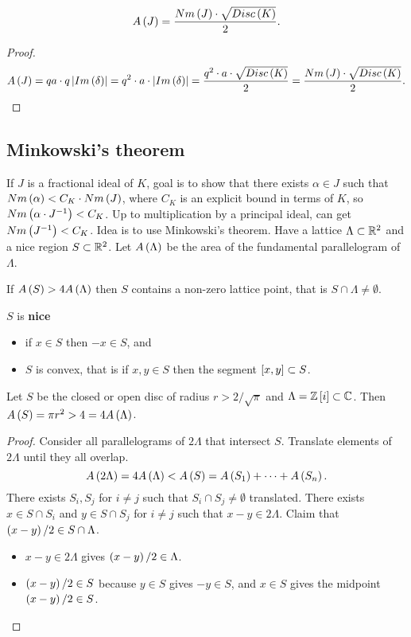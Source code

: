 \begin{proposition}
$$ A\rb{J} = \dfrac{Nm\rb{J} \cdot \sqrt{Disc\rb{K}}}{2}. $$
\end{proposition}

\begin{proof}
$$ A\rb{J} = qa \cdot q\abs{Im\rb{\delta}} = q^2 \cdot a \cdot \abs{Im\rb{\delta}} = \dfrac{q^2 \cdot a \cdot \sqrt{Disc\rb{K}}}{2} = \dfrac{Nm\rb{J} \cdot \sqrt{Disc\rb{K}}}{2}. $$
\end{proof}

\subsection{Minkowski's theorem}

If $ J $ is a fractional ideal of $ K $, goal is to show that there exists $ \alpha \in J $ such that $ Nm\rb{\alpha} < C_K \cdot Nm\rb{J} $, where $ C_K $ is an explicit bound in terms of $ K $, so $ Nm\rb{\alpha \cdot J^{-1}} < C_K $. Up to multiplication by a principal ideal, can get $ Nm\rb{J^{-1}} < C_K $. Idea is to use Minkowski's theorem. Have a lattice $ \Lambda \subset \R^2 $ and a nice region $ S \subset \R^2 $. Let $ A\rb{\Lambda} $ be the area of the fundamental parallelogram of $ \Lambda $.

\begin{theorem}
If $ A\rb{S} > 4A\rb{\Lambda} $ then $ S $ contains a non-zero lattice point, that is $ S \cap \Lambda \ne \emptyset $.
\end{theorem}

$ S $ is \textbf{nice}
\begin{itemize}
\item if $ x \in S $ then $ -x \in S $, and
\item $ S $ is convex, that is if $ x, y \in S $ then the segment $ \sb{x, y} \subset S $.
\end{itemize}

\begin{example*}
Let $ S $ be the closed or open disc of radius $ r > 2 / \sqrt{\pi} $ and $ \Lambda = \Z\sb{i} \subset \C $. Then $ A\rb{S} = \pi r^2 > 4 = 4A\rb{\Lambda} $.
\end{example*}

\begin{proof}
Consider all parallelograms of $ 2\Lambda $ that intersect $ S $. Translate elements of $ 2\Lambda $ until they all overlap.
$$ A\rb{2\Lambda} = 4A\rb{\Lambda} < A\rb{S} = A\rb{S_1} + \dots + A\rb{S_n}. $$
There exists $ S_i, S_j $ for $ i \ne j $ such that $ S_i \cap S_j \ne \emptyset $ translated. There exists $ x \in S \cap S_i $ and $ y \in S \cap S_j $ for $ i \ne j $ such that $ x - y \in 2\Lambda $. Claim that $ \rb{x - y} / 2 \in S \cap \Lambda $.
\begin{itemize}
\item $ x - y \in 2\Lambda $ gives $ \rb{x - y} / 2 \in \Lambda $.
\item $ \rb{x - y} / 2 \in S $ because $ y \in S $ gives $ -y \in S $, and $ x \in S $ gives the midpoint $ \rb{x - y} / 2 \in S $.
\end{itemize}
\end{proof}

